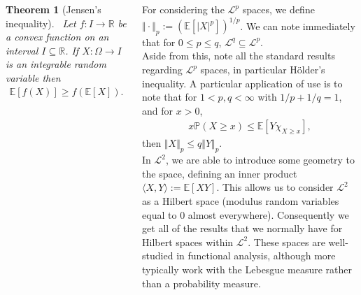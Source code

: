\documentclass{tikzposter} %
\newtheorem{theorem}{Theorem}
\begin{document}
\begin{columns}
{{    \begin{theorem}[Jensen's inequality]
      \ Let $f : I \to \mathbb{R}$ be a convex function on an interval $I \subseteq \mathbb{R}$. If $X : \Omega \to I$ is an integrable random variable then
      \begin{align*}
        \mathbb{E}[f(X)] \ge f(\mathbb{E}[X]).
      \end{align*}
    \end{theorem}
    \hphantom{}
    }

    For considering the $\mathcal{L}^{p}$ spaces, we define $\Vert \cdot \Vert_{p} := \left(\mathbb{E}[|X|^{p}]\right)^{1/p}$. We can note immediately that for $0 \le p \le q$, $\mathcal{L}^{q} \subseteq \mathcal{L}^{p}$. \\

    Aside from this, note all the standard results regarding $\mathcal{L}^{p}$ spaces, in particular H\"{o}lder's inequality. A particular application of use is to note that for $1 < p, q < \infty$ with $1/p+1/q = 1$, and for $x > 0$,
    \begin{align*}
      x \mathbb{P}(X \ge x) \le \mathbb{E}[Y \chi_{X \ge x}],
    \end{align*}
    then $\Vert X \Vert_{p} \le q \Vert Y \Vert_{p}$. \\

    In $\mathcal{L}^{2}$, we are able to introduce some geometry to the space, defining an inner product $\langle X, Y \rangle := \mathbb{E}[XY]$. This allows us to consider $\mathcal{L}^{2}$ as a Hilbert space (modulus random variables equal to $0$ almost everywhere). Consequently we get all of the results that we normally have for Hilbert spaces within $\mathcal{L}^{2}$. These spaces are well-studied in functional analysis, although more typically work with the Lebesgue measure rather than a probability measure.
  }




\end{columns}
\end{document}
